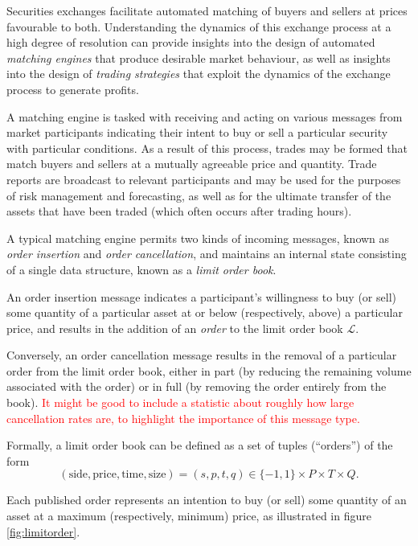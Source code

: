 \documentclass[honours,12pt]{unswthesis}
\numberwithin{equation}{section}
\begin{document}
Securities exchanges facilitate automated matching of buyers and sellers at prices favourable to both. Understanding the dynamics of this exchange process at a high degree of resolution can provide insights into the design of automated \textit{matching engines} that produce desirable market behaviour, as well as insights into the design of \textit{trading strategies} that exploit the dynamics of the exchange process to generate profits.

A matching engine is tasked with receiving and acting on various messages from market participants indicating their intent to buy or sell a particular security with particular conditions. As a result of this process, trades may be formed that match buyers and sellers at a mutually agreeable price and quantity. Trade reports are broadcast to relevant participants and may be used for the purposes of risk management and forecasting, as well as for the ultimate transfer of the assets that have been traded (which often occurs after trading hours).

\bigskip

A typical matching engine permits two kinds of incoming messages, known as \textit{order insertion} and \textit{order cancellation}, and maintains an internal state consisting of a single data structure, known as a \textit{limit order book}.

\medskip

An order insertion message indicates a participant's willingness to buy (or sell) some quantity of a particular asset at or below (respectively, above) a particular price, and results in the addition of an \textit{order} to the limit order book $\mathcal{L}$.

Conversely, an order cancellation message results in the removal of a particular order from the limit order book, either in part (by reducing the remaining volume associated with the order) or in full (by removing the order entirely from the book). \textcolor{red}{It might be good to include a statistic about roughly how large cancellation rates are, to highlight the importance of this message type.}

Formally, a limit order book can be defined as a set of tuples (``orders'') of the form
$$(\text{side},\text{price},\text{time},\text{size}) = (s,p,t,q)\in \{-1,1\}\times P\times T\times Q.$$

Each published order represents an intention to buy (or sell) some quantity of an asset at a maximum (respectively, minimum) price, as illustrated in figure \ref{fig:limitorder}.
\end{document}
